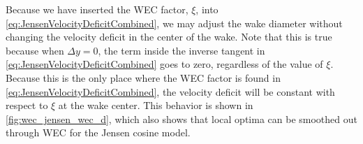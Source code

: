 \documentclass{jpconf}
\begin{document}
Because we have inserted the WEC factor, $\xi$, into \cref{eq:JensenVelocityDeficitCombined}, we may adjust the wake diameter without changing the velocity deficit in the center of the wake. Note that this is true because when $\Delta y = 0$, the term inside the inverse tangent in \cref{eq:JensenVelocityDeficitCombined} goes to zero, regardless of the value of $\xi$. Because this is the only place where the WEC factor is found in \cref{eq:JensenVelocityDeficitCombined}, the velocity deficit will be constant with respect to $\xi$ at the wake center. This behavior is shown in \cref{fig:wec_jensen_wec_d}, which also shows that local optima can be smoothed out through WEC for the Jensen cosine model.

\end{document}
